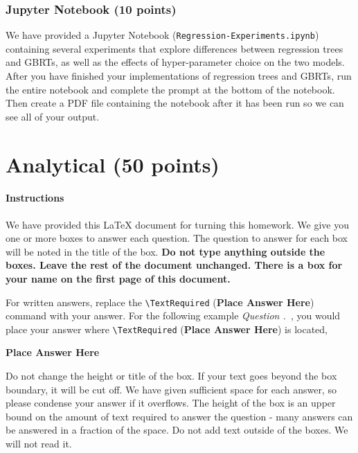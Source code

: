 \documentclass[11pt]{article}
\newcommand{\Checked}{{\LARGE \XBox}}%
\newcommand{\Unchecked}{{\LARGE \Square}}%
\newcommand{\TextRequired}{{\textbf{Place Answer Here}}}%
\newcounter{QuestionCounter}
\newcounter{SubQuestionCounter}[QuestionCounter]
\newcommand{\subquestiontitle}{Question \theQuestionCounter.\theSubQuestionCounter~}
\newcommand{\newsubquestion}{\stepcounter{SubQuestionCounter}}
\begin{document}
\subsubsection{Jupyter Notebook (10 points)}
We have provided a Jupyter Notebook ({\tt Regression-Experiments.ipynb}) containing several experiments that explore differences between regression trees and GBRTs, as well as the effects of hyper-parameter choice on the two models. After you have finished your implementations of regression trees and GBRTs, run the entire notebook and complete the prompt at the bottom of the notebook. Then create a PDF file containing the notebook after it has been run so we can see all of your output.

\newpage
\section{Analytical (50 points)}

\paragraph{Instructions}
We have provided this \LaTeX{} document for turning this homework. We give you
one or more boxes to answer each question.  The question to answer for each box
will be noted in the title of the box. {\bf Do not type anything outside the
  boxes. Leave the rest of the document unchanged.  There is a box for your name
  on the first page of this document. }

For written answers, replace the \lstinline{\TextRequired} (\TextRequired)
command with your answer. For the following example \textit{\subquestiontitle},
you would place your answer where \lstinline{\TextRequired} (\TextRequired) is
located,

\begin{answertext}{2.1cm}{}
\TextRequired
\end{answertext}
\newsubquestion
Do not change the height or title of the box. If your text goes beyond the box boundary, it will be cut off.  We have given sufficient space for each answer, so please condense your answer if it overflows. The height of the box is an upper bound on the amount of text required to answer the question - many answers can be answered in a fraction of the space.  Do not add text outside of the boxes. We will not read it.

\end{document}

